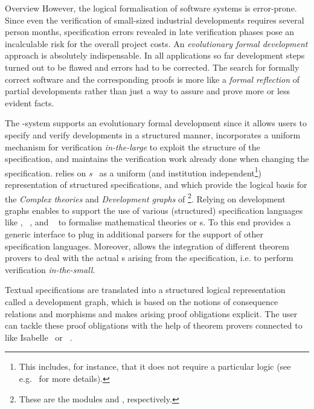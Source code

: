 \begin{omgroup}[id=maya,short=\maya,creators={autexier,hutter,mossakowski,shairer}]
\begin{omgroup}{Overview}
However, the logical formalisation of software systems is error-prone.  Since even the
verification of small-sized industrial developments requires several person months,
specification errors revealed in late verification phases pose an incalculable risk for
the overall project costs. An {\emph{evolutionary formal
    development}} approach is absolutely
indispensable. In all applications so far development steps turned out to be flawed and
errors had to be corrected. The search for formally correct software and the corresponding
proofs is more like a {\emph{formal reflection}} of partial developments rather than just
a way to assure and prove more or less evident facts.

The {\maya}-system supports an evolutionary formal development since it allows users to
specify and verify developments in a structured manner, incorporates a uniform mechanism
for verification {\emph{in-the-large}} to exploit the
structure of the specification, and maintains the verification work already done when
changing the specification. {\maya} relies on
{\emph{s}}~\cite{AH-05-a,Hutter:mocsv00} as a uniform (and
institution independent\footnote{This includes, for instance, that it does not require a
  particular logic (see e.g.~\cite{MAH-06-a} for more details).})  representation of
structured specifications, and which provide the logical basis for the {\emph{Complex
    theories}} and {\emph{Development graphs}} of {\omdoc}\footnote{These are the modules
  {} and {}, respectively.}.  Relying on development graphs
enables {\maya} to support the use of various (structured) specification languages like
{\omdoc}, {\casl}~\cite{CoFI:2004:CASL-RM}, and {\vsesl}~\cite{VSE00} to formalise
mathematical theories or
{s}.  To this end {\maya} provides a generic
interface to plug in additional parsers for the support of other specification languages.
Moreover, {\maya} allows the integration of different theorem provers to deal with the
actual {s} arising from the specification, i.e.  to perform
verification {\emph{in-the-small}}.

Textual specifications are translated into a structured logical representation called a
development graph, which is based on the notions of consequence relations and morphisms
and makes arising proof obligations explicit.  The user can tackle these proof obligations
with the help of theorem provers connected to {\maya} like Isabelle~\cite{Paulson:iagtp94}
or {\inka}~\cite{INKA5}.


\end{omgroup}
\end{omgroup}
